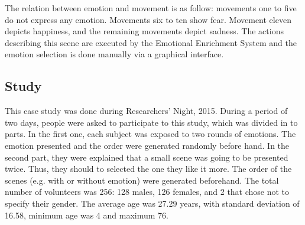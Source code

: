The relation between emotion and movement is as follow: movements one to five do not express any emotion. Movements six to ten show fear. Movement eleven depicts happiness, and the remaining movements depict sadness. The actions describing this scene are executed by the Emotional Enrichment System and the emotion selection is done manually via a graphical interface.

\subsection{Study}

This case study was done during Researchers' Night, 2015. During a period of two days, people were asked to participate to this study, which was divided in to parts. In the first one, each subject was exposed to two rounds of emotions. The emotion presented and the order were generated randomly before hand. In the second part, they were explained that a small scene was going to be presented twice. Thus, they should to selected the one they like it more. The order of the scenes (e.g. with or without emotion) were generated beforehand. The total number of volunteers was 256: 128 males, 126 females, and 2 that chose not to specify their gender. The average age was 27.29 years, with standard deviation of 16.58, minimum age was 4 and maximum 76.
